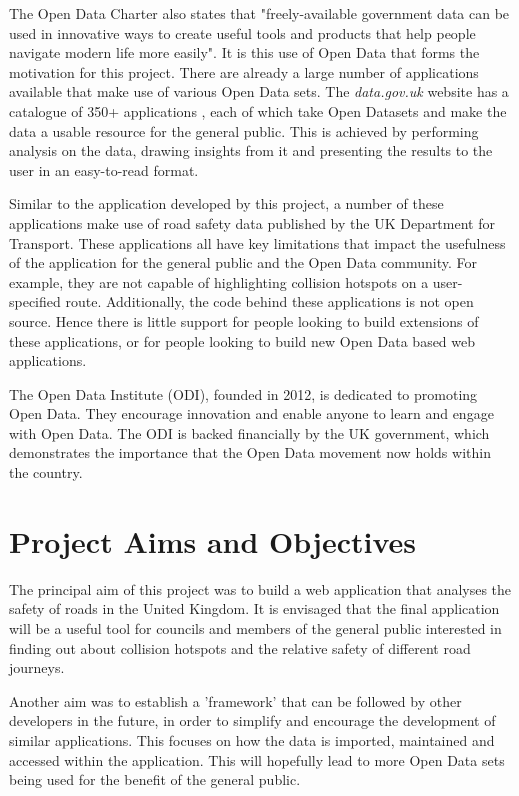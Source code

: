 \documentclass[authoryearcitations]{UoYCSproject}
\begin{document}
The Open Data Charter also states that "freely-available government data can be used in innovative ways to create useful tools and products that help people navigate modern life more easily". It is this use of Open Data that forms the motivation for this project. There are already a large number of applications available that make use of various Open Data sets. The \textit{data.gov.uk} website has a catalogue of 350+ applications \citep{Data.go}, each of which take Open Datasets and make the data a usable resource for the general public. This is achieved by performing analysis on the data, drawing insights from it and presenting the results to the user in an easy-to-read format. 

Similar to the application developed by this project, a number of these applications make use of road safety data published by the UK Department for Transport. These applications all have key limitations that impact the usefulness of the application for the general public and the Open Data community. For example, they are not capable of highlighting collision hotspots on a user-specified route. Additionally, the code behind these applications is not open source. Hence there is little support for people looking to build extensions of these applications, or for people looking to build new Open Data based web applications.

The Open Data Institute (ODI), founded in 2012, is dedicated to promoting Open Data. They encourage innovation and enable anyone to learn and engage with Open Data. The ODI is backed financially by the UK government, which demonstrates the importance that the Open Data movement now holds within the country.

\section{Project Aims and Objectives}

The principal aim of this project was to build a web application that analyses the safety of roads in the United Kingdom. It is envisaged that the final application will be a useful tool for councils and members of the general public interested in finding out about collision hotspots and the relative safety of different road journeys.

Another aim was to establish a 'framework' that can be followed by other developers in the future, in order to simplify and encourage the development of similar applications. This focuses on how the data is imported, maintained and accessed within the application. This will hopefully lead to more Open Data sets being used for the benefit of the general public.
\end{document}
